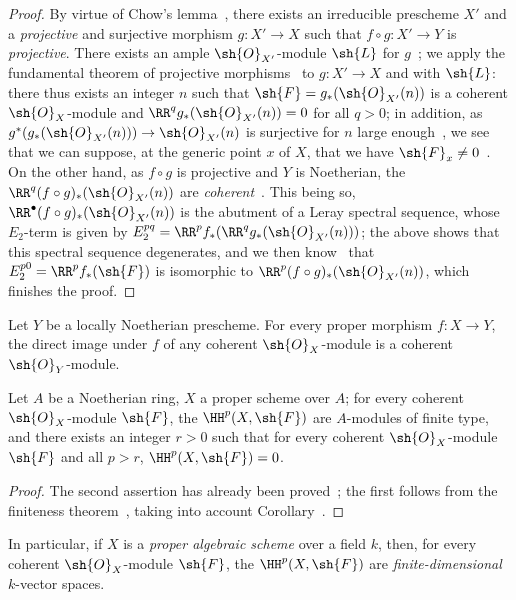 \begin{proof}
By virtue of Chow's lemma~, there exists an irreducible prescheme $X'$ and a \emph{projective} and surjective morphism $g:X'\to X$ such that $f\circ g:X'\to Y$ is \emph{projective}.
There exists an ample $\sh{O}_{X'}$-module $\sh{L}$ for $g$~; we apply the fundamental theorem of projective morphisms~ to $g:X'\to X$ and with $\sh{L}$: there thus exists an integer $n$ such that $\sh{F}=g_*(\sh{O}_{X'}(n))$ is a coherent $\sh{O}_X$-module and $\RR^q g_*(\sh{O}_{X'}(n))=0$ for all $q>0$; in addition, as $g^*(g_*(\sh{O}_{X'}(n)))\to\sh{O}_{X'}(n)$ is surjective for $n$ large enough~, we see that we can suppose, at the generic point $x$ of $X$, that we have $\sh{F}_x\neq 0$~.
On the other hand, as $f\circ g$ is projective and $Y$ is Noetherian, the $\RR^q(f\circ g)_*(\sh{O}_{X'}(n))$ are \emph{coherent}~.
This being so, $\RR^\bullet(f\circ g)_*(\sh{O}_{X'}(n))$ is the abutment of a Leray spectral sequence, whose $E_2$-term is given by $E_2^{pq}=\RR^p f_*(\RR^q g_*(\sh{O}_{X'}(n)))$; the above shows that this spectral sequence degenerates, and we then know~ that $E_2^{p0}=\RR^p f_*(\sh{F})$ is isomorphic to $\RR^p(f\circ g)_*(\sh{O}_{X'}(n))$, which finishes the proof.
\end{proof}

\begin{corollary}[3.2.2]
\label{III.3.2.2}
Let $Y$ be a locally Noetherian prescheme.
For every proper morphism $f:X\to Y$, the direct image under $f$ of any coherent $\sh{O}_X$-module is a coherent $\sh{O}_Y$-module.
\end{corollary}

\begin{corollary}[3.2.3]
\label{III.3.2.3}
Let $A$ be a Noetherian ring, $X$ a proper scheme over $A$; for every coherent $\sh{O}_X$-module $\sh{F}$, the $\HH^p(X,\sh{F})$ are $A$-modules of finite type, and there exists an integer $r>0$ such that for every coherent $\sh{O}_X$-module $\sh{F}$ and all $p>r$, $\HH^p(X,\sh{F})=0$.
\end{corollary}

\begin{proof}
The second assertion has already been proved~; the first follows from the finiteness theorem~, taking into account Corollary~.
\end{proof}

In particular, if $X$ is a \emph{proper algebraic scheme} over a field $k$, then, for every coherent $\sh{O}_X$-module $\sh{F}$, the $\HH^p(X,\sh{F})$ are \emph{finite-dimensional} $k$-vector spaces.

